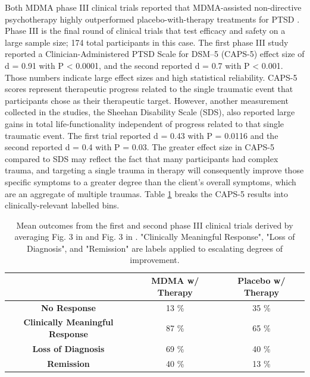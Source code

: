 \documentclass[12pt,letterpaper]{book}
\begin{document}
Both MDMA phase III clinical trials reported that MDMA-assisted non-directive psychotherapy highly outperformed placebo-with-therapy treatments for PTSD \cite{mitchellMDMAClinicalTrial,mitchellMDMAClinicalTrial2}. Phase III is the final round of clinical trials that test efficacy and safety on a large sample size; 174 total participants in this case. The first phase III study reported a Clinician-Administered PTSD Scale for DSM–5 (CAPS-5) effect size of d = 0.91 with P < 0.0001, and the second reported d = 0.7 with P < 0.001. Those numbers indicate large effect sizes and high statistical reliability. CAPS-5 scores represent therapeutic progress related to the single traumatic event that participants chose as their therapeutic target. However, another measurement collected in the studies, the Sheehan Disability Scale (SDS), also reported large gains in total life-functionality independent of progress related to that single traumatic event. The first trial reported d = 0.43 with P = 0.0116 and the second reported d = 0.4 with P = 0.03. The greater effect size in CAPS-5 compared to SDS may reflect the fact that many participants had complex trauma, and targeting a single trauma in therapy will consequently improve those specific symptoms to a greater degree than the client's overall symptoms, which are an aggregate of multiple traumas. Table \ref{table:efficacy} breaks the CAPS-5 results into clinically-relevant labelled bins.
\FloatBarrier
\begin{table}[htbp]
    \centering
    \caption{Mean outcomes from the first and second phase III clinical trials derived by averaging Fig. 3 in \textcite{mitchellMDMAClinicalTrial} and Fig. 3 in \textcite{mitchellMDMAClinicalTrial2}. "Clinically Meaningful Response", "Loss of Diagnosis", and "Remission" are labels applied to escalating degrees of improvement.}
    \label{table:efficacy}
    \begin{tabular}{|c|c|c|}
    \hline
     & \textbf{MDMA w/ Therapy} & \textbf{Placebo w/ Therapy} \\ \hline
    \textbf{No Response}          & 13 \%          & 35 \%          \\ \hline
    \textbf{Clinically Meaningful Response}          & 87 \%          & 65 \%         \\ \hline
    \textbf{Loss of Diagnosis} & 69 \% & 40 \% \\ \hline
    \textbf{Remission}          & 40 \%          & 13 \%          \\ \hline
    \end{tabular}
\end{table}
\FloatBarrier
\end{document}

